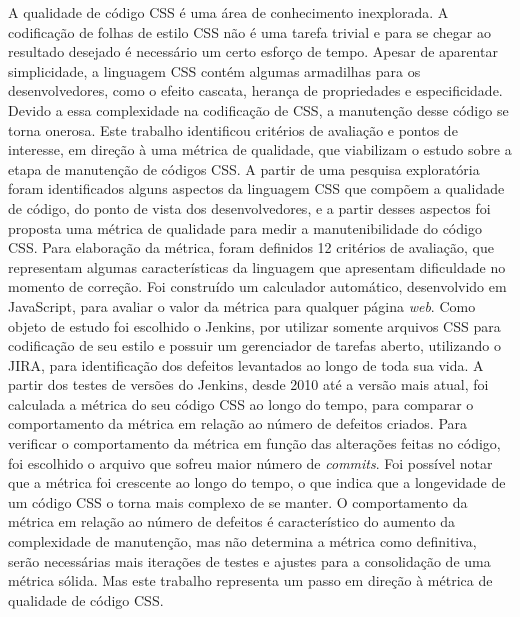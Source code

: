 %
%

\begin{resumo}

A qualidade de código CSS é uma área de conhecimento inexplorada. A codificação de folhas de estilo CSS não é uma tarefa trivial e para se chegar ao resultado desejado é necessário um certo esforço de tempo. Apesar de aparentar simplicidade, a linguagem CSS contém algumas armadilhas para os desenvolvedores, como o efeito cascata, herança de propriedades e especificidade. Devido a essa complexidade na codificação de CSS, a manutenção desse código se torna onerosa. Este trabalho identificou critérios de avaliação e pontos de interesse, em direção à uma métrica de qualidade, que viabilizam o estudo sobre a etapa de manutenção de códigos CSS. A partir de uma pesquisa exploratória foram identificados alguns aspectos da linguagem CSS que compõem a qualidade de código, do ponto de vista dos desenvolvedores, e a partir desses aspectos foi proposta uma métrica de qualidade para medir a manutenibilidade do código CSS. Para elaboração da métrica, foram definidos 12 critérios de avaliação, que representam algumas características da linguagem que apresentam dificuldade no momento de correção. Foi construído um calculador automático, desenvolvido em JavaScript, para avaliar o valor da métrica para qualquer página \textit{web}. Como objeto de estudo foi escolhido o Jenkins, por utilizar somente arquivos CSS para codificação de seu estilo e possuir um gerenciador de tarefas aberto, utilizando o JIRA, para identificação dos defeitos levantados ao longo de toda sua vida. A partir dos testes de versões do Jenkins, desde 2010 até a versão mais atual, foi calculada a métrica do seu código CSS ao longo do tempo, para comparar o comportamento da métrica em relação ao número de defeitos criados. Para verificar o comportamento da métrica em função das alterações feitas no código, foi escolhido o arquivo que sofreu maior número de \textit{commits}. Foi possível notar que a métrica foi crescente ao longo do tempo, o que indica que a longevidade de um código CSS o torna mais complexo de se manter. O comportamento da métrica em relação ao número de defeitos é característico do aumento da complexidade de manutenção, mas não determina a métrica como definitiva, serão necessárias mais iterações de testes e ajustes para a consolidação de uma métrica sólida. Mas este trabalho representa um passo em direção à métrica de qualidade de código CSS.


\end{resumo}
